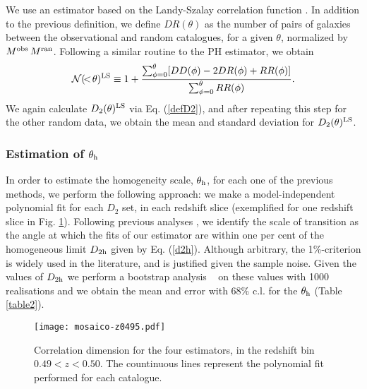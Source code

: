 \documentclass[useAMS,usenatbib]{mn2e}
\begin{document}
We use an estimator based on the Landy-Szalay correlation function \citep{landyszalay93}. In addition to the previous definition, we  define 
$DR(\theta)$ as the number of pairs of galaxies between the observational and random catalogues, for a given $\theta$, normalized by $M^{\rm obs} \, M^{\rm ran}$. Following a similar routine to the PH estimator, we obtain
\begin{equation}
\label{NLS}
{\cal N}(\!<\!\theta)^{{\rm LS}} \equiv 
1 + \frac{\sum^{\theta}_{\phi = 0} [DD(\phi)-2DR(\phi)+RR(\phi)]}{\sum^{\theta}_{\phi = 0} RR(\phi)} .
\end{equation}
We again calculate $D_2(\theta)^{\rm LS}$ via Eq. (\ref{defD2}), and after repeating this step for the other random data, we obtain the mean and standard deviation for $D_2(\theta)^{{\rm LS}}$. 

\subsubsection{Estimation of $\theta_{\rm h}$}

In order to estimate the homogeneity scale, $\theta_{\rm h}$, for each one of the previous methods, we perform the following approach: we make a model-independent polynomial fit for each $D_{2}$ set, in each redshift slice (exemplified for one redshift slice in Fig. \ref{fig1}). Following previous analyses \citep{alonso14,alonso15,ntelis17}, we identify the scale of transition as the angle at which the fits of our estimator are within one per cent of the homogeneous limit $D_{2{\rm h}}$ given by Eq. (\ref{d2h}). Although arbitrary, the 1\%-criterion is widely used in the literature, and is justified given the sample noise. Given the values of $D_{2{\rm h}}$ we perform a bootstrap analysis ~\citep{efron83} on these values with 1000 realisations and we obtain the mean and error with 68\% c.l. for the $\theta_{\rm h}$ (Table \ref{table2}).

\begin{figure}
\vspace{-0.5cm}
\texttt{[image: mosaico-z0495.pdf]}
\caption{Correlation dimension  for the four estimators, in the redshift bin $0.49 < z < 0.50$. The countinuous lines represent the polynomial fit performed for each catalogue.}
\label{fig1}
\end{figure}
\end{document}
